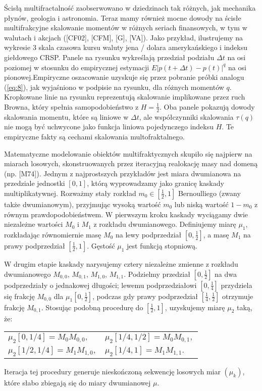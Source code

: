 \documentclass[12pt]{article}
\theoremstyle{definition}
\begin{document}
Ścisłą multifractalność zaobserwowano w dziedzinach tak różnych, jak mechanika płynów, geologia i astronomia. Teraz mamy również mocne dowody na ścisłe multifrakcyjne skalowanie momentów w różnych seriach finansowych, w tym w walutach i akcjach ([CF02], [CFM], [G], [VA]). Jako przykład, ilustrujemy na wykresie 3 skala czasowa kursu waluty jena / dolara amerykańskiego i indeksu giełdowego CRSP. Panele na rysunku wykreślają przedział podziału $\Delta t$ na osi poziomej w stosunku do empirycznej estymacji $E|p(t+\Delta t)-p(t)|^q$ na osi pionowej.Empiryczne oszacowanie uzyskuje się przez pobranie próbki analogu (\ref{eq:8}), jak wyjaśniono w podpisie na rysunku, dla różnych momentów $q$. Kropkowane linie na rysunku reprezentują skalowanie implikowane przez ruch Browna, który spełnia samopodobieństwo z $H=\frac{1}{2}$. Oba panele pokazują dowody skalowania momentu, które są liniowe w $\Delta t$, ale współczynniki skalowania $\tau (q)$ nie mogą być uchwycone jako funkcja liniowa pojedynczego indeksu $H$. Te empiryczne fakty są cechami skalowania multofraktalnego.

Matematyczne modelowanie obiektów multifraktycznych skupiło się najpierw na miarach losowych, skonstruowanych przez iteracyjną realokację masy nad domeną (np. [M74]). Jednym z najprostszych przykładów jest miara dwumianowa na przedziale jednostki $[0, 1]$, którą wyprowadzamy jako granicę kaskady multiplikatywnej. Rozważmy stały rozkład $m_0 \in [\frac{1}{2}, 1]$ Bernoulliego (zwany także dwumianowym), przyjmując wysoką wartość $m_0$ lub niską wartość $1-m_0$ z równym prawdopodobieństwem. W pierwszym kroku kaskady wyciągamy dwie niezależne wartości $M_0$ i $M_1$ z rozkładu dwumianowego. Definiujemy miarę $\mu_1$, rozkładając równomiernie masę $M_0$ na lewy podprzedział $[0, \frac{1}{2}]$, a masę $M_1$ na prawy podprzedział $[\frac{1}{2}, 1]$. Gęstość $\mu_1$ jest funkcją stopniową.

W drugim etapie kaskady narysujemy cztery niezależne zmienne z rozkładu dwumianowego $M_{0,0}$, $M_{0,1}$, $M_{1,0}$, $M_{1,1}$. Podzielmy przedział $[0, \frac{1}{2}]$ na dwa podprzedziały o jednakowej długości; lewemu podprzedziałowi $[0, \frac{1}{4}]$ przydziela się frakcję $M_{0,0}$ dla $\mu_1 [0, \frac{1}{2}]$, podczas gdy prawy podprzedział $[\frac{1}{4}, \frac{1}{2}]$ otrzymuje frakcję $M_{0,1}$. Stosując podobną procedurę do $[\frac{1}{2},1]$, uzyskujemy miarę $\mu_2$ taką, że:
\begin{center}
\begin{tabular}{l l}
$\mu_2[0, 1/4] = M_0 M_{0,0}, $ &
$\mu_2[1/4, 1/2] = M_0 M_{0,1}, $\\
$\mu_2[1/2, 1/4] = M_1 M_{1,0}, $&
$\mu_2[1/4, 1] = M_1 M_{1,1}. $\\
\end{tabular}
\end{center}
Iteracja tej procedury generuje nieskończoną sekwencję losowych miar $(\mu_k)$, które słabo zbiegają się do miary dwumianowej $\mu$.
\end{document}
